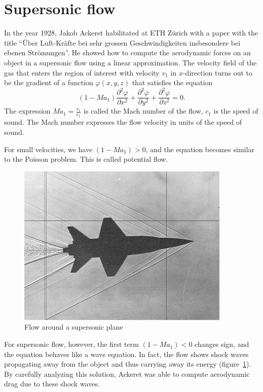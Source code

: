 %
%
%
\section{Supersonic flow}
In the year 1928, Jakob Ackeret habilitated at ETH Zürich with a 
paper with the title
``Über Luft-Kräfte bei sehr grossen
Geschwindigkeiten insbesondere bei ebenen Strömungen''.
He showed how to compute the aerodynamic forces on an object
in a supersonic flow using a linear approximation.
The velocity field of the gas that enters the region of interest with
velocity $v_1$ in $x$-direction turns out to be the gradient of
a function $\varphi(x,y,z)$ that satisfies the equation
\[
(1-\textit{Ma}_1)\frac{\partial^2\varphi}{\partial x^2}
+
\frac{\partial^2\varphi}{\partial y^2}
+
\frac{\partial^2\varphi}{\partial z^2}=0.
\]
The expression
$\textit{Ma}_1=\frac{v_1}{c_1}$ is called the Mach number of the flow,
$c_1$ is the speed of sound.
The Mach number expresses the flow velocity in units of the speed of sound.

For small velocities, we have $(1-\textit{Ma}_1)>0$, and the equation
becomes similar to the Poisson problem.
This is called potential flow.

\begin{figure}
\begin{center}
\includegraphics[width=0.8\hsize]{../common/graphics/i-5-1}
\end{center}
\caption{Flow around a supersonic plane\label{examples:ueberschall2d}}
\end{figure}

For supersonic flow, however, the first term
$(1-\textit{Ma}_1) < 0$
changes sign, and the equation behaves like a wave equation.
In fact, the flow shows shock waves propagating away from the object
and thus carrying away its energy
(figure~\ref{examples:ueberschall2d}).
By carefully analyzing this solution, Ackeret was able to compute
aerodynamic drag due to these shock waves.

